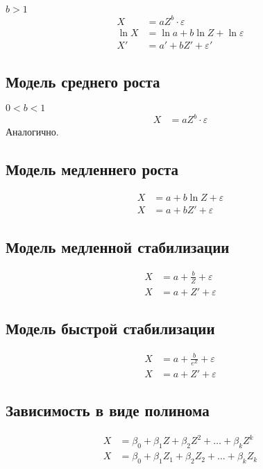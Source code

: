\(b > 1\)
\begin{align*}
    X     & = aZ^b \cdot \varepsilon            \\
    \ln X & = \ln a + b \ln Z + \ln \varepsilon \\
    X'    & = a' + bZ' + \varepsilon'
\end{align*}

\subsection{Модель среднего роста}

\(0 < b < 1\)
\begin{align*}
    X & = a Z ^b \cdot \varepsilon
\end{align*}
Аналогично.

\subsection{Модель медленнего роста}

\begin{align*}
    X & = a + b \ln Z + \varepsilon \\
    X & = a + b Z' + \varepsilon
\end{align*}

\subsection{Модель медленной стабилизации}

\begin{align*}
    X & = a + \frac{b}{Z} + \varepsilon \\
    X & = a + Z' + \varepsilon
\end{align*}

\subsection{Модель быстрой стабилизации}

\begin{align*}
    X & = a + \frac{b}{e^Z} + \varepsilon \\
    X & = a + Z' + \varepsilon
\end{align*}

\subsection{Зависимость в виде полинома}

\begin{align*}
    X & = \beta_0 + \beta_1 Z + \beta_2 Z^2 + \dots + \beta_k Z^k   \\
    X & = \beta_0 + \beta_1 Z_1 + \beta_2 Z_2 + \dots + \beta_k Z_k
\end{align*}

